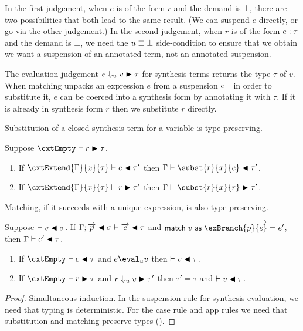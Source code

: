 \documentclass[usenames,dvipsnames,preprint]{sigplanconf}
\begin{document}
In the first judgement, when $e$ is of the form $r$ and the demand is
$\bot$, there are two possibilities that both lead to the same
result. (We can suspend $e$ directly, or go via the other judgement.)
In the second judgement, when $r$ is of the form ${e}:{\tau}$
and the demand is $\bot$, we need the $u \sqsupset \bot$ side-condition to
ensure that we obtain we want a suspension of an annotated term, not
an annotated suspension.

The evaluation judgement $e \Downarrow_{u} v \blacktriangleright \tau$ for synthesis
terms returns the type $\tau$ of $v$. When matching unpacks an
expression $e$ from a suspension ${e}_{\bot}$ in order to
substitute it, $e$ can be coerced into a synthesis form by annotating
it with $\tau$. If it is already in synthesis form $r$ then we
substitute $r$ directly.

Substitution of a closed synthesis term for a variable is
type-preserving.

\begin{lemma}[Substitution]
\label{lem:substitution:sound}
Suppose $\cxtEmpty \vdash r \synth \tau$.
\begin{enumerate}
\item If $\cxtExtend{\Gamma}{x}{\tau} \vdash e \tycheck \tau'$ then
  $\Gamma \vdash \subst{r}{x}{e} \tycheck \tau'$.
\item If $\cxtExtend{\Gamma}{x}{\tau} \vdash r \synth \tau'$ then
  $\Gamma \vdash \subst{r}{x}{r} \synth \tau'$.
\end{enumerate}
\end{lemma}

Matching, if it succeeds with a unique expression, is also
type-preserving.

\begin{lemma}[Matching]
\label{lem:matching:sound}
  Suppose $\vdash v \blacktriangleleft \sigma$. If $\Gamma;\overrightarrow{p} \blacktriangleleft
  \sigma \vdash \overrightarrow{e} \blacktriangleleft \tau$ and
  $\match{v}{\vec{\exBranch{p}{e}}} = e'$, then $\Gamma \vdash e'
  \blacktriangleleft \tau$.
\end{lemma}

\begin{lemma}
\item
\begin{enumerate}
\item If $\cxtEmpty \vdash e \tycheck \tau$ and $e \eval_{u} v$ then
  $\vdash v \blacktriangleleft \tau$.
\item If $\cxtEmpty \vdash r \synth \tau$ and $r \Downarrow_{u} v \blacktriangleright
  \tau'$ then $\tau' = \tau$ and $\vdash v \blacktriangleleft \tau$.
\end{enumerate}
\end{lemma}
\begin{proof}
  Simultaneous induction. In the suspension rule for synthesis
  evaluation, we need that typing is deterministic. For the case rule
  and app rules we need that substitution and matching preserve types
  ().
\end{proof}
\end{document}
